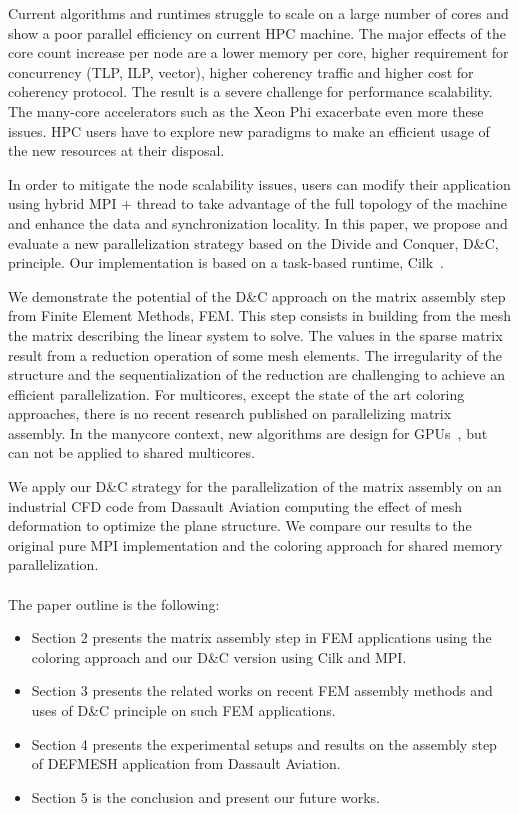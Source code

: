 \documentclass{IOS-Book-Article}
\begin{document}
Current algorithms and runtimes struggle to scale on a large number of cores and show a poor parallel efficiency on current HPC machine. 
The major effects of the core count increase per node are a lower memory per core, higher requirement for concurrency (TLP, ILP, vector), higher coherency traffic and higher cost for coherency protocol.
The result is a severe challenge for performance scalability. The many-core accelerators such as the Xeon Phi exacerbate even more these issues.
HPC users have to explore new paradigms to make an efficient usage of the new resources at their disposal. 

In order to mitigate the node scalability issues, users can modify their application using hybrid MPI + thread to take advantage of the full topology of the machine and enhance the data and synchronization locality.
In this paper, we propose and evaluate a new parallelization strategy based on the Divide and Conquer, D\&C, principle. Our implementation is based on a task-based runtime, Cilk~\cite{cilk5}. 

We demonstrate the potential of the D\&C approach on the matrix assembly step from Finite Element Methods, FEM.
This step consists in building from the mesh the matrix describing the linear system to solve.
The values in the sparse matrix result from a reduction operation of some mesh elements.
The irregularity of the structure and the sequentialization of the reduction are challenging to achieve an efficient parallelization.
For multicores, except the state of the art coloring approaches, there is no recent research published on parallelizing matrix assembly.
In the manycore context, new algorithms are design for GPUs~\cite{Stanford,CPUGPUasm}, but can not be applied to shared multicores.

We apply our D\&C strategy for the parallelization of the matrix assembly on an industrial CFD code from Dassault Aviation computing the effect of mesh deformation to optimize the plane structure.
We compare our results to the original pure MPI implementation and the coloring approach for shared memory parallelization.
\\\\
The paper outline is the following:
\begin{itemize}
\item Section 2 presents the matrix assembly step in FEM applications using the coloring approach and our D\&C version using Cilk and MPI.
\item Section 3 presents the related works on recent FEM assembly methods and uses of D\&C principle on such FEM applications.
\item Section 4 presents the experimental setups and results on the assembly step of DEFMESH application from Dassault Aviation.
\item Section 5 is the conclusion and present our future works.
\end{itemize}
\end{document}
